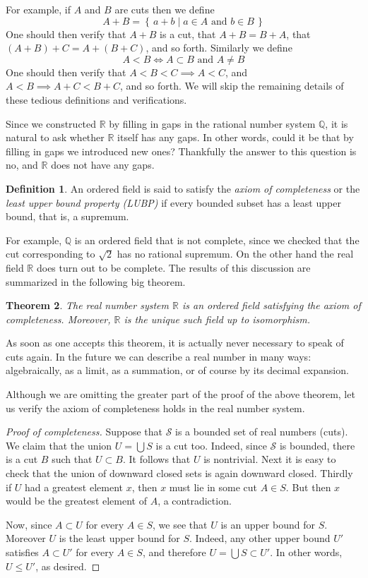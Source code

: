 \documentclass[11pt,oneside]{amsbook}
\newcommand{\set}[1]{\left\{\,#1\,\right\}}
\newcommand{\Q}{\mathbb Q}
\newcommand{\R}{\mathbb R}
\theoremstyle{definition}
\theoremstyle{plain}
\newtheorem{theorem}{Theorem}[section]
\theoremstyle{definition}
\newtheorem{definition}[theorem]{Definition}
\theoremstyle{remark}
\numberwithin{equation}{section}
\numberwithin{figure}{section}
\begin{document}
For example, if $A$ and $B$ are cuts then we define
\[A+B=\set{a+b\mid a\in A\text{ and }b\in B}
\]
One should then verify that $A+B$ is a cut, that $A+B=B+A$, that $(A+B)+C=A+(B+C)$, and so forth. Similarly we define
\[A<B\iff A\subset B\text{ and }A\neq B
\]
One should then verify that $A<B<C\implies A<C$, and $A<B\implies A+C<B+C$, and so forth. We will skip the remaining details of these tedious definitions and verifications.

Since we constructed $\R$ by filling in gaps in the rational number system $\Q$, it is natural to ask whether $\R$ itself has any gaps. In other words, could it be that by filling in gaps we introduced new ones? Thankfully the answer to this question is no, and $\R$ does not have any gaps.

\begin{definition}
  An ordered field is said to satisfy the \emph{axiom of completeness} or the \emph{least upper bound property (LUBP)} if every bounded subset has a least upper bound, that is, a supremum.
\end{definition}

For example, $\Q$ is an ordered field that is not complete, since we checked that the cut corresponding to $\sqrt2$ has no rational supremum. On the other hand the real field $\R$ does turn out to be complete. The results of this discussion are summarized in the following big theorem.

\begin{theorem}
  The real number system $\R$ is an ordered field satisfying the axiom of completeness. Moreover, $\R$ is the unique such field up to isomorphism.
\end{theorem}

As soon as one accepts this theorem, it is actually never necessary to speak of cuts again. In the future we can describe a real number in many ways: algebraically, as a limit, as a summation, or of course by its decimal expansion.

Although we are omitting the greater part of the proof of the above theorem, let us verify the axiom of completeness holds in the real number system.

\begin{proof}[Proof of completeness]
  Suppose that $\mathcal S$ is a bounded set of real numbers (cuts). We claim that the union $U=\bigcup S$ is a cut too. Indeed, since $\mathcal S$ is bounded, there is a cut $B$ such that  $U\subset B$. It follows that $U$ is nontrivial. Next it is easy to check that the union of downward closed sets is again downward closed. Thirdly if $U$ had a greatest element $x$, then $x$ must lie in some cut $A\in S$. But then $x$ would be the greatest element of $A$, a contradiction.

  Now, since $A\subset U$ for every $A\in S$, we see that $U$ is an upper bound for $S$. Moreover $U$ is the least upper bound for $S$. Indeed, any other upper bound $U'$ satisfies $A\subset U'$ for every $A\in S$, and therefore $U=\bigcup S\subset U'$. In other words, $U\leq U'$, as desired.
\end{proof}
\end{document}
